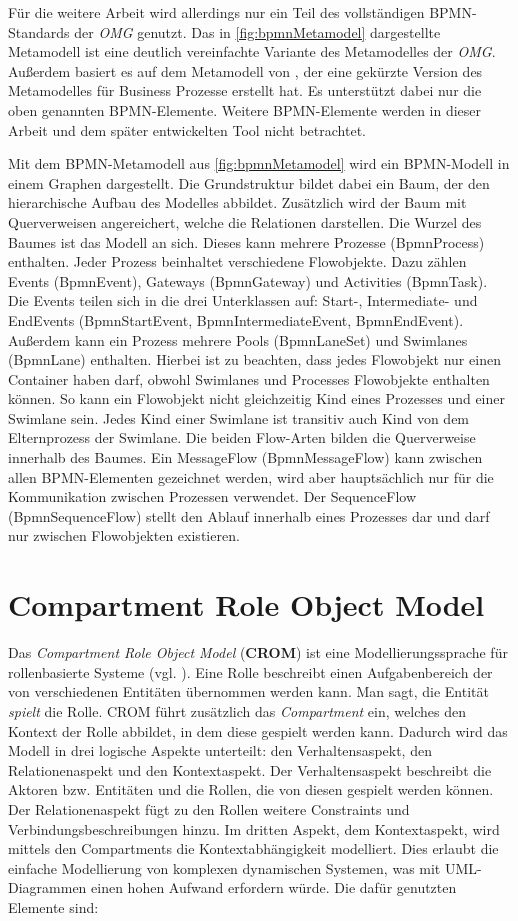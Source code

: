 Für die weitere Arbeit wird allerdings nur ein Teil des vollständigen BPMN-Standards der \emph{OMG} genutzt.
Das in \cref{fig:bpmnMetamodel} dargestellte Metamodell ist eine deutlich vereinfachte Variante des Metamodelles der \emph{OMG}.
Außerdem basiert es auf dem Metamodell von \cite{Loja2010}, der eine gekürzte Version des Metamodelles für Business Prozesse erstellt hat.
Es unterstützt dabei nur die oben genannten BPMN-Elemente.
Weitere BPMN-Elemente werden in dieser Arbeit und dem später entwickelten Tool nicht betrachtet.

Mit dem BPMN-Metamodell aus \cref{fig:bpmnMetamodel} wird ein BPMN-Modell in einem Graphen dargestellt.
Die Grundstruktur bildet dabei ein Baum, der den hierarchische Aufbau des Modelles abbildet.
Zusätzlich wird der Baum mit Querverweisen angereichert, welche die Relationen darstellen.
Die Wurzel des Baumes ist das Modell an sich.
Dieses kann mehrere Prozesse (BpmnProcess) enthalten.
Jeder Prozess beinhaltet verschiedene Flowobjekte. 
Dazu zählen Events (BpmnEvent), Gateways (BpmnGateway) und Activities (BpmnTask).
Die Events teilen sich in die drei Unterklassen auf: Start-, Intermediate- und EndEvents (Bpmn\-Start\-Event, BpmnIntermediateEvent, BpmnEndEvent).
Außerdem kann ein Prozess mehrere Pools (BpmnLaneSet) und Swimlanes (BpmnLane) enthalten.
Hierbei ist zu beachten, dass jedes Flowobjekt nur einen Container haben darf, obwohl Swimlanes und Processes Flowobjekte enthalten können.
So kann ein Flowobjekt nicht gleichzeitig Kind eines Prozesses und einer Swimlane sein.
Jedes Kind einer Swimlane ist transitiv auch Kind von dem Elternprozess der Swimlane.
Die beiden Flow-Arten bilden die Querverweise innerhalb des Baumes.
Ein MessageFlow (BpmnMessageFlow) kann zwischen allen BPMN-Elementen gezeichnet werden, wird aber hauptsächlich nur für die Kommunikation zwischen Prozessen verwendet.
Der SequenceFlow (BpmnSequenceFlow) stellt den Ablauf innerhalb eines Prozesses dar und darf nur zwischen Flowobjekten existieren.

\section{Compartment Role Object Model}

Das \emph{Compartment Role Object Model} (\textbf{CROM}) ist eine Modellierungssprache für rollenbasierte Systeme (vgl. \cite{kuhn2014metamodel}).
Eine Rolle beschreibt einen Aufgabenbereich der von verschiedenen Entitäten übernommen werden kann.
Man sagt, die Entität \emph{spielt} die Rolle.
CROM führt zusätzlich das \emph{Compartment} ein, welches den Kontext der Rolle abbildet, in dem diese gespielt werden kann.
Dadurch wird das Modell in drei logische Aspekte unterteilt: den Verhaltensaspekt, den Relationenaspekt und den Kontextaspekt.
Der Verhaltensaspekt beschreibt die Aktoren bzw. Entitäten und die Rollen, die von diesen gespielt werden können.
Der Relationenaspekt fügt zu den Rollen weitere Constraints und Verbindungsbeschreibungen hinzu.
Im dritten Aspekt, dem Kontextaspekt, wird mittels den Compartments die Kontextabhängigkeit modelliert.
Dies erlaubt die einfache Modellierung von komplexen dynamischen Systemen, was mit UML-Diagrammen einen hohen Aufwand erfordern würde. 
Die dafür genutzten Elemente sind:

